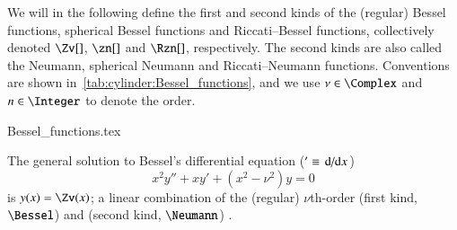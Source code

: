 


\newcommand{\myemph}{\textbf}
\Zv[1][1=\nu]{\Cylindrical[#1][Z]}
\zn[1][1=n]{\Cylindrical[#1][z]}
\Rzn[1][1=n]{\Cylindrical[#1][R]}




We will in the following define the first and second kinds of the (regular) Bessel functions, spherical Bessel functions and Riccati--Bessel functions, collectively denoted $\Zv[]$, $\zn[]$ and $\Rzn[]$, respectively. The second kinds are also called the Neumann, spherical Neumann and Riccati--Neumann functions. Conventions are shown in~\cref{tab:cylinder:Bessel_functions}, and we use $\nu\in\Complex$ and $n\in\Integer$ to denote the order.


\begin{table}[h]
    {Bessel_functions.tex}
    \caption{Types of Bessel functions and conventions. Here, $\nu\in\Complex$ and $n\in \Integer$ are constants, and $x\in \Complex$ is a variable. Linear combinations of the first and second kinds are denoted in the second column. Subscripts mean order, and parenthesised superscripts refer to kind.}
    \label{tab:cylinder:Bessel_functions}
\end{table}

The general solution to Bessel's differential equation ($'\equiv \dv*{}{x}$)
\begin{equation}\label{eq:cylinder:Bessels_eq}
    x^2 y'' + x y' + (x^2 -\nu^2 )y = 0
\end{equation}
is $y(x) = \Zv(x)$; a linear combination of the (regular) $\nu$th-order  (first kind, $\Bessel$) and  (second kind, $\Neumann$) .






